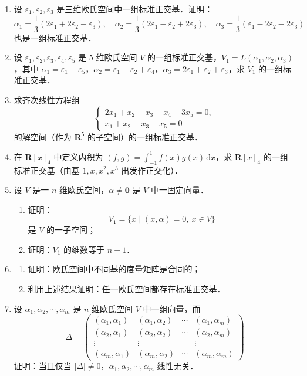 \begin{enumerate}
  \item 设 $\varepsilon_1,\varepsilon_2,\varepsilon_3$ 是三维欧氏空间中一组标准正交基．证明：
  \[
  \alpha_1=\frac{1}{3}(2\varepsilon_1+2\varepsilon_2-\varepsilon_3),\quad
  \alpha_2=\frac{1}{3}(2\varepsilon_1-\varepsilon_2+2\varepsilon_3),\quad
  \alpha_3=\frac{1}{3}(\varepsilon_1-2\varepsilon_2-2\varepsilon_3)
  \]
  也是一组标准正交基．

  \ansproof
  \item 设 $\varepsilon_1,\varepsilon_2,\varepsilon_3,\varepsilon_4,\varepsilon_5$ 是 $5$ 维欧氏空间 $V$ 的一组标准正交基，$V_1=L(\alpha_1,\alpha_2,\alpha_3)$，其中 $\alpha_1=\varepsilon_1+\varepsilon_5$，$\alpha_2=\varepsilon_1-\varepsilon_2+\varepsilon_4$，$\alpha_3=2\varepsilon_1+\varepsilon_2+\varepsilon_3$，求 $V_1$ 的一组标准正交基．

  \anscompute
  \item 求齐次线性方程组
  \[
  \begin{cases}
    2x_1+x_2-x_3+x_4-3x_5=0,\\
    x_1+x_2-x_3+x_5=0
  \end{cases}
  \]
  的解空间（作为 $\mathbf{R}^5$ 的子空间）的一组标准正交基．

  \anscompute
  \item 在 $\mathbf{R}[x]_4$ 中定义内积为 $(f,g)=\int_{-1}^{1}f(x)g(x)\,\mathrm{d}x$，求 $\mathbf{R}[x]_4$ 的一组标准正交基（由基 $1,x,x^2,x^3$ 出发作正交化）．

  \anscompute
  \item 设 $V$ 是一 $n$ 维欧氏空间，$\alpha\ne\mathbf{0}$ 是 $V$ 中一固定向量．
  \begin{enumerate}
    \item 证明：
    \[
    V_1=\{x\mid (x,\alpha)=0,\ x\in V\}
    \]
    是 $V$ 的一子空间；
  \anssub
    \item 证明：$V_1$ 的维数等于 $n-1$．
  \anssub
  \end{enumerate}

  \item
  \begin{enumerate}
    \item 证明：欧氏空间中不同基的度量矩阵是合同的；
  \anssub
    \item 利用上述结果证明：任一欧氏空间都存在标准正交基．
  \anssub
  \end{enumerate}

  \item 设 $\alpha_1,\alpha_2,\cdots,\alpha_m$ 是 $n$ 维欧氏空间 $V$ 中一组向量，而
  \[
  \Delta=\begin{pmatrix}
    (\alpha_1,\alpha_1) & (\alpha_1,\alpha_2) & \cdots & (\alpha_1,\alpha_m) \\
    (\alpha_2,\alpha_1) & (\alpha_2,\alpha_2) & \cdots & (\alpha_2,\alpha_m) \\
    \vdots & \vdots & & \vdots \\
    (\alpha_m,\alpha_1) & (\alpha_m,\alpha_2) & \cdots & (\alpha_m,\alpha_m)
  \end{pmatrix}
  \]
  证明：当且仅当 $|\Delta|\ne 0$，$\alpha_1,\alpha_2,\cdots,\alpha_m$ 线性无关．


\end{enumerate}
